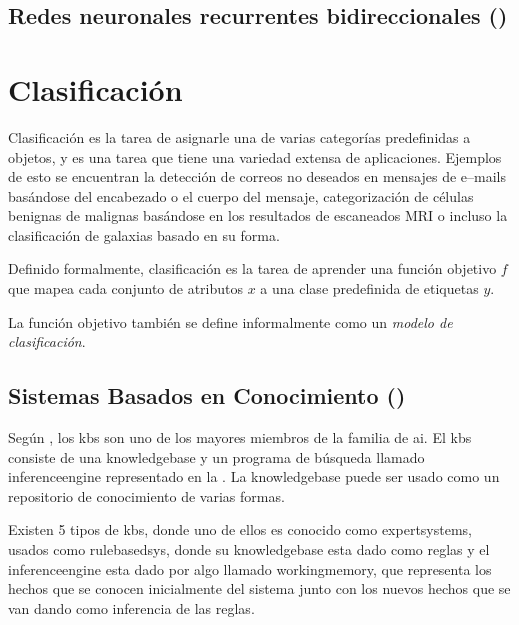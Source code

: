 \subsection{Redes neuronales recurrentes bidireccionales ()}


\section{Clasificación} \label{subsec:clasification}
Clasificación es la tarea de asignarle una de varias categorías predefinidas a objetos, y es una tarea que tiene una variedad extensa de aplicaciones. Ejemplos de esto se encuentran la detección de correos no deseados en mensajes de e--mails basándose del encabezado o el cuerpo del mensaje, categorización de células benignas de malignas basándose en los resultados de escaneados MRI o incluso la clasificación de galaxias basado en su forma.

Definido formalmente, clasificación es la tarea de aprender una función objetivo $f$ que mapea cada conjunto de atributos $x$ a una clase predefinida de etiquetas $y$.

La función objetivo también se define informalmente como un \emph{modelo de clasificación}.


\subsection{Sistemas Basados en Conocimiento ()} \label{sec:KBS}
Según \cite{sajja2010knowledge}, los \gls{kbs} son uno de los mayores miembros de la familia de \gls{ai}. El \gls{kbs} consiste de una \gls{knowledgebase} y un programa de búsqueda llamado \gls{inferenceengine} representado en la . La \gls{knowledgebase} puede ser usado como un repositorio de conocimiento de varias formas.

Existen 5 tipos de \gls{kbs}, donde uno de ellos es conocido como \gls{expertsystems}, usados como \gls{rulebasedsys}, donde su \gls{knowledgebase} esta dado como reglas y el \gls{inferenceengine} esta dado por algo llamado \gls{workingmemory}, que representa los hechos que se conocen inicialmente del sistema junto con los nuevos hechos que se van dando como inferencia de las reglas.

